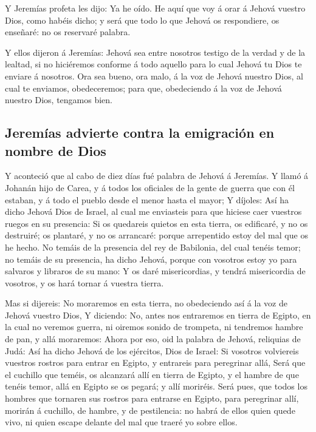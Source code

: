  Y Jeremías profeta les dijo: Ya he oído. He aquí que voy á
orar á Jehová vuestro Dios, como habéis dicho; y será que todo lo que
Jehová os respondiere, os enseñaré: no os reservaré palabra.

 Y ellos dijeron á Jeremías: Jehová sea entre nosotros
testigo de la verdad y de la lealtad, si no hiciéremos conforme á todo
aquello para lo cual Jehová tu Dios te enviare á nosotros. 
Ora sea bueno, ora malo, á la voz de Jehová nuestro Dios, al cual te
enviamos, obedeceremos; para que, obedeciendo á la voz de Jehová nuestro
Dios, tengamos bien.

\hypertarget{jeremuxedas-advierte-contra-la-emigraciuxf3n-en-nombre-de-dios}{%
\subsection{Jeremías advierte contra la emigración en nombre de
Dios}\label{jeremuxedas-advierte-contra-la-emigraciuxf3n-en-nombre-de-dios}}

 Y aconteció que al cabo de diez días fué palabra de Jehová
á Jeremías.  Y llamó á Johanán hijo de Carea, y á todos los
oficiales de la gente de guerra que con él estaban, y á todo el pueblo
desde el menor hasta el mayor;  Y díjoles: Así ha dicho
Jehová Dios de Israel, al cual me enviasteis para que hiciese caer
vuestros ruegos en su presencia:  Si os quedareis quietos
en esta tierra, os edificaré, y no os destruiré; os plantaré, y no os
arrancaré: porque arrepentido estoy del mal que os he hecho.
 No temáis de la presencia del rey de Babilonia, del cual
tenéis temor; no temáis de su presencia, ha dicho Jehová, porque con
vosotros estoy yo para salvaros y libraros de su mano:  Y
os daré misericordias, y tendrá misericordia de vosotros, y os hará
tornar á vuestra tierra.

 Mas si dijereis: No moraremos en esta tierra, no
obedeciendo así á la voz de Jehová vuestro Dios,  Y
diciendo: No, antes nos entraremos en tierra de Egipto, en la cual no
veremos guerra, ni oiremos sonido de trompeta, ni tendremos hambre de
pan, y allá moraremos:  Ahora por eso, oid la palabra de
Jehová, reliquias de Judá: Así ha dicho Jehová de los ejércitos, Dios de
Israel: Si vosotros volviereis vuestros rostros para entrar en Egipto, y
entrareis para peregrinar allá,  Será que el cuchillo que
teméis, os alcanzará allí en tierra de Egipto, y el hambre de que tenéis
temor, allá en Egipto se os pegará; y allí moriréis.  Será
pues, que todos los hombres que tornaren sus rostros para entrarse en
Egipto, para peregrinar allí, morirán á cuchillo, de hambre, y de
pestilencia: no habrá de ellos quien quede vivo, ni quien escape delante
del mal que traeré yo sobre ellos.

